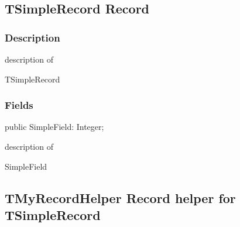 \documentclass{report}
\newif\ifpdf
\begin{document}
\subsection*{TSimpleRecord Record}
\fi
\label{ok_class_record_helpers.TSimpleRecord}
\subsubsection*{\large{\textbf{Description}}\normalsize\hspace{1ex}\hfill}
description of \begin{ttfamily}TSimpleRecord\end{ttfamily}\subsubsection*{\large{\textbf{Fields}}\normalsize\hspace{1ex}\hfill}
\begin{list}{}{
\setlength{\itemindent}{0cm}
\setlength{\listparindent}{0cm}
\setlength{\leftmargin}{\evensidemargin}
\addtolength{\leftmargin}{\tmplength}
\settowidth{\labelsep}{X}
\addtolength{\leftmargin}{\labelsep}
\setlength{\labelwidth}{\tmplength}
}
\label{ok_class_record_helpers.TSimpleRecord-SimpleField}
\item[\textbf{SimpleField}\hfill]
\ifpdf
\begin{flushleft}
\fi
\begin{ttfamily}
public SimpleField: Integer;\end{ttfamily}

\ifpdf
\end{flushleft}
\fi


\par description of \begin{ttfamily}SimpleField\end{ttfamily}\end{list}
\ifpdf
\subsection*{\large{\textbf{TMyRecordHelper Record helper for TSimpleRecord}}\normalsize\hspace{1ex}\hrulefill}
\else
\subsection*{TMyRecordHelper Record helper for TSimpleRecord}
\fi
\label{ok_class_record_helpers.TMyRecordHelper}
\end{document}
